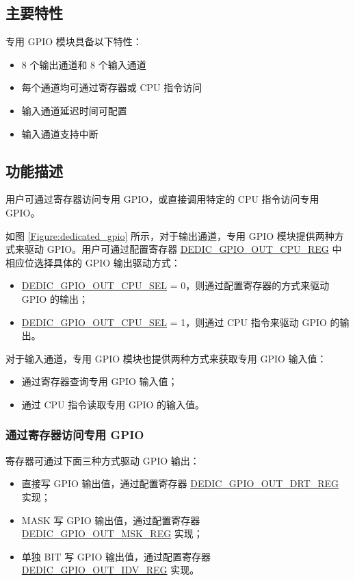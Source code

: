 \documentclass[main\_\_CN.tex]{subfiles}
\begin{document}
\subsection{主要特性}

专用 GPIO 模块具备以下特性：
\begin{itemize}
    \item 8 个输出通道和 8 个输入通道
    \item 每个通道均可通过寄存器或 CPU 指令访问
    \item 输入通道延迟时间可配置
    \item 输入通道支持中断
\end{itemize}

\subsection{功能描述}

用户可通过寄存器访问专用 GPIO，或直接调用特定的 CPU 指令访问专用 GPIO。

如图 \ref{Figure:dedicated_gpio} 所示，对于输出通道，专用 GPIO 模块提供两种方式来驱动 GPIO。用户可通过配置寄存器 \hyperref[regdesc:DEDICGPIOOUTCPUREG]{DEDIC\_GPIO\_OUT\_CPU\_REG} 中相应位选择具体的 GPIO 输出驱动方式：
\begin{itemize}
    \item \hyperref[fielddesc:DEDICGPIOOUTCPUSEL0]{DEDIC\_GPIO\_OUT\_CPU\_SEL} = 0，则通过配置寄存器的方式来驱动 GPIO 的输出；
    \item \hyperref[fielddesc:DEDICGPIOOUTCPUSEL0]{DEDIC\_GPIO\_OUT\_CPU\_SEL} = 1，则通过 CPU 指令来驱动 GPIO 的输出。
\end{itemize}
对于输入通道，专用 GPIO 模块也提供两种方式来获取专用 GPIO 输入值：
\begin{itemize}
    \item 通过寄存器查询专用 GPIO 输入值；
    \item 通过 CPU 指令读取专用 GPIO 的输入值。
\end{itemize}

\subsubsection{通过寄存器访问专用 GPIO}

寄存器可通过下面三种方式驱动 GPIO 输出：
\begin{itemize}
    \item 直接写 GPIO 输出值，通过配置寄存器 \hyperref[regdesc:DEDICGPIOOUTDRTREG]{DEDIC\_GPIO\_OUT\_DRT\_REG} 实现；
    \item MASK 写 GPIO 输出值，通过配置寄存器 \hyperref[regdesc:DEDICGPIOOUTMSKREG]{DEDIC\_GPIO\_OUT\_MSK\_REG} 实现；
    \item 单独 BIT 写 GPIO 输出值，通过配置寄存器 \hyperref[regdesc:DEDICGPIOOUTIDVREG]{DEDIC\_GPIO\_OUT\_IDV\_REG} 实现。
\end{itemize}
\end{document}
